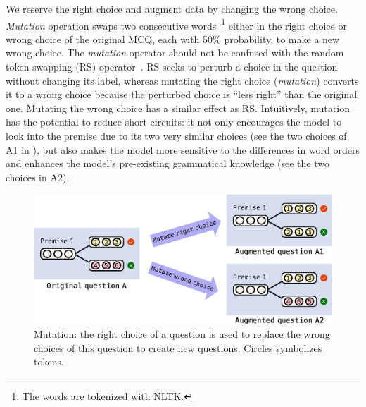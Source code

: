 We reserve the 
right choice and augment data by changing the wrong choice. 
\textit{Mutation} operation swaps two consecutive words~\footnote{The words are 
tokenized with NLTK.} either in 
the right choice or wrong choice of 
the original MCQ, each with 50\% probability, to make a new wrong choice.
The \textit{mutation} operator should not be confused with the random token
swapping (RS) operator~\cite{artetxe2017unsupervised,lample2017unsupervised}.
RS seeks to perturb a choice in the question without changing its label,
whereas mutating the right choice (\textit{mutation}) converts it to a wrong choice because the 
perturbed choice is ``less right'' than the original one.
Mutating the wrong choice has a similar effect as RS.
Intuitively, mutation has the potential to reduce short circuits:
it not only encourages the model to look into the premise due to its
two very similar choices (see the two choices of A1 in ),
but also makes the model more sensitive to the differences in word orders 
and enhances the model's pre-existing grammatical knowledge (see the two choices in
A2). 
\begin{figure}[th]
        \centering
        \includegraphics[width=0.9\columnwidth]{figure/revised_mutation.eps}
        \caption{Mutation: the right choice of a question
                is used to replace the wrong choices of this question to create
                new questions. Circles symbolizes tokens.}
        \label{fig:mutation}
\end{figure}



